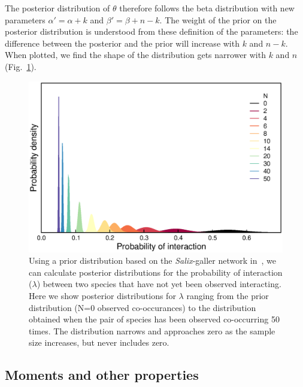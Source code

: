 \documentclass[12pt]{article}
\begin{document}
      The posterior distribution of $\theta$ therefore follows the beta distribution with new parameters $\alpha'= \alpha+k$ and $\beta'=\beta+n-k$. The weight of the prior on the posterior distribution is understood from these definition of the parameters: the difference between the posterior and the prior will increase with $k$ and $n-k$. When plotted, we find the shape of the distribution gets narrower with $k$ and $n$ (Fig.~\ref{Salix_pdfs}). 

      \begin{figure}[ht]
        \label{Salix_pdfs}
        \caption{Using a prior distribution based on the \emph{Salix}-galler network in~\citet{Barbour2016}, we can calculate posterior distributions for the probability of interaction ($\lambda$) between two species that have not yet been observed interacting. Here we show posterior distributions for $\lambda$ ranging from the prior distribution (N=0 observed co-occurances) to the distribution obtained when the pair of species has been observed co-occurring 50 times. The distribution narrows and approaches zero as the sample size increases, but never includes zero.}
        \includegraphics*[width=.8\textwidth]{figures/Salix_Galler_pdfs_increasing_N.eps}
        \end{figure}


    \subsection*{Moments and other properties}
\end{document}
